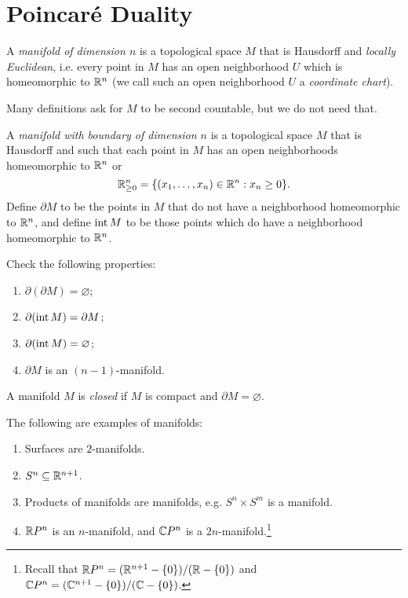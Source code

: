 \section{Poincar\'e Duality}

\begin{definition}
  A \emph{manifold of dimension $n$} is a
  topological space $M$ that is Hausdorff
  and \emph{locally Euclidean}, i.e. every
  point in $M$ has an open neighborhood
  $U$ which is homeomorphic to
  $\mathbb{R}^n$ (we call such an open neighborhood $U$ a \emph{coordinate chart}).
\end{definition}

\begin{remark}
  Many definitions ask for $M$ to be second
  countable, but we do not need that.
\end{remark}

\begin{definition}
  A \emph{manifold with boundary of dimension $n$}
  is a topological space $M$ that is Hausdorff
  and such that each point in $M$ has an
  open neighborhoods homeomorphic
  to $\mathbb{R}^n$ or
  \[
    \mathbb{R}^n_{\ge 0} = \{ (x_1, \ldots, x_n) \in \mathbb{R}^n : x_n \ge 0 \}.
  \]
  Define $\partial M$ to be the points in
  $M$ that do not have a neighborhood
  homeomorphic to $\mathbb{R}^n$, and define $\operatorname{int} M$
  to be those points which do
  have a neighborhood homeomorphic to $\mathbb{R}^n$.
\end{definition}

\begin{exercise}
  Check the following properties:
  \begin{enumerate}
    \item $\partial (\partial M) = \varnothing$;
    \item $\partial(\operatorname{int} M) = \partial M$;
    \item $\partial(\operatorname{int} M) = \varnothing$;
    \item $\partial M$ is an $(n - 1)$-manifold.
  \end{enumerate}
\end{exercise}

\begin{definition}
  A manifold $M$ is \emph{closed} if
  $M$ is compact and $\partial M = \varnothing$.
\end{definition}

\begin{example}
  The following are examples of manifolds:
  \begin{enumerate}
    \item Surfaces are $2$-manifolds.
    \item $S^n \subseteq \mathbb{R}^{n + 1}$.
    \item Products of manifolds are manifolds,
      e.g. $S^n \times S^m$ is a manifold.
    \item $\mathbb{R} P^n$ is an $n$-manifold, and
      $\mathbb{C} P^n$ is a $2n$-manifold.\footnote{Recall that $\mathbb{R} P^n = (\mathbb{R}^{n + 1} - \{0\}) / (\mathbb{R} - \{0\})$ and $\mathbb{C} P^n = (\mathbb{C}^{n + 1} - \{0\}) / (\mathbb{C} - \{0\})$.}
  \end{enumerate}
\end{example}

